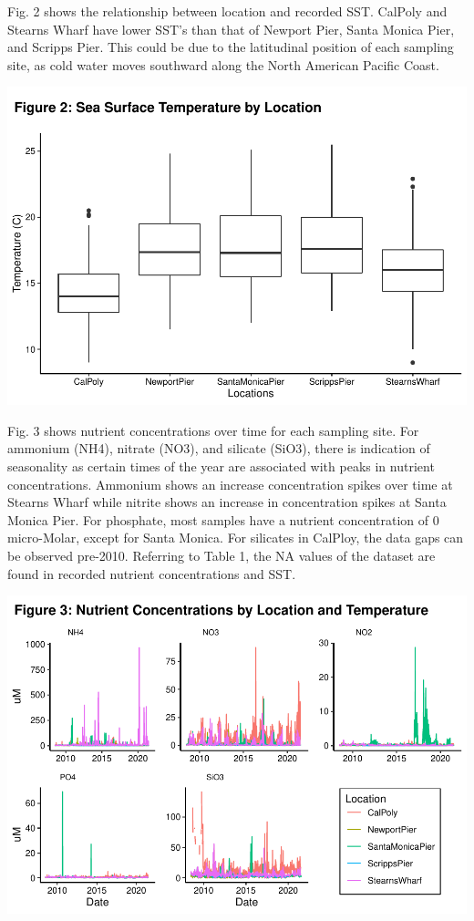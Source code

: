 \documentclass[
  12pt,
]{article}
\begin{document}
\newpage

Fig. 2 shows the relationship between location and recorded SST. CalPoly
and Stearns Wharf have lower SST's than that of Newport Pier, Santa
Monica Pier, and Scripps Pier. This could be due to the latitudinal
position of each sampling site, as cold water moves southward along the
North American Pacific Coast.

\includegraphics{Habs_Final_Report_files/figure-latex/Exploratory Analysis Part 2 SST-1.pdf}

\newpage

Fig. 3 shows nutrient concentrations over time for each sampling site.
For ammonium (NH4), nitrate (NO3), and silicate (SiO3), there is
indication of seasonality as certain times of the year are associated
with peaks in nutrient concentrations. Ammonium shows an increase
concentration spikes over time at Stearns Wharf while nitrite shows an
increase in concentration spikes at Santa Monica Pier. For phosphate,
most samples have a nutrient concentration of 0 micro-Molar, except for
Santa Monica. For silicates in CalPloy, the data gaps can be observed
pre-2010. Referring to Table 1, the NA values of the dataset are found
in recorded nutrient concentrations and SST.

\includegraphics{Habs_Final_Report_files/figure-latex/Exploratory Analysis Part 3-1.pdf}
\end{document}
